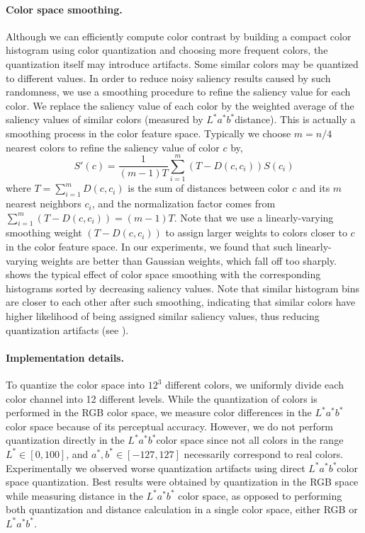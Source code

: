 \documentclass[final]{cvpr}
\newcommand{\Lab}{$L^*a^*b^*$}
\newcommand{\vnudge}{\vspace*{-.1in}}
\newcommand{\mypara}[1]{\paragraph{#1.}}
\begin{document}
\vnudge
\mypara{Color space smoothing}
Although we can efficiently compute color contrast by building a compact color histogram
using color quantization and choosing more frequent colors,
the quantization itself may introduce artifacts.
%
Some similar colors may be quantized to different values.
In order to reduce noisy saliency results caused by such randomness,
we use a smoothing procedure to refine the saliency value for each color.
%
We replace the saliency value of each color by the weighted average of the saliency
values of similar colors (measured by \Lab distance).
%
This is actually a smoothing process in the color feature space. Typically we choose
$m=n/4$ nearest colors to refine the saliency value of color $c$ by,
\begin{equation}\label{equ:smoothing}
    S'(c) = \frac{1}{(m-1)T} \sum_{i=1}^{m} (T-D(c, c_i))S(c_i)
\end{equation}
where $T=\sum_{i=1}^{m} D(c, c_i)$ is the sum of distances between color $c$ and its
$m$ nearest neighbors $c_i$, and the normalization factor comes from
    $\sum_{i=1}^{m} (T-D(c, c_i))=(m-1)T.$
%
Note that we use a linearly-varying smoothing weight $(T-D(c, c_i))$ to assign
larger weights to colors closer to $c$ in the color feature space.
%
In our experiments, we found that such linearly-varying weights are better than Gaussian
weights, which fall off too sharply.
%
 shows the typical effect of color space smoothing with the
corresponding histograms sorted by decreasing saliency values.
%
Note that similar histogram bins are closer to each other after such  smoothing,
indicating that similar colors have higher likelihood of being assigned similar saliency values,
thus reducing quantization artifacts (see ).


\vnudge
\mypara{Implementation details}
To quantize the color space into $12^3$ different colors, we uniformly divide each color
channel into 12 different levels.
%
While the quantization of colors is performed in the RGB color space, we measure color
differences in the \Lab color space because of its perceptual accuracy.
%
However, we do not perform quantization directly in the \Lab color space since not all colors in
the range $L^*\in[0, 100]$, and $a^*, b^*\in[-127,127]$ necessarily correspond to real colors.
%
Experimentally we observed worse quantization artifacts using direct \Lab color space
quantization.
%
Best results were obtained by quantization in the RGB space while measuring distance in the \Lab
color space, as opposed to performing both quantization and distance calculation in a
single color space, either RGB or \Lab.
\end{document}
